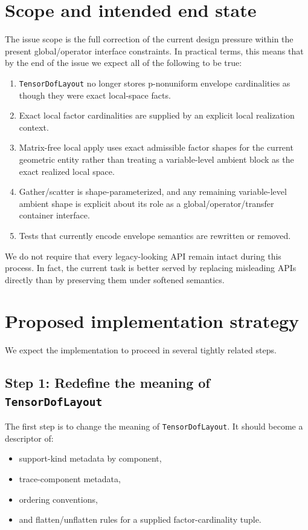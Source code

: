 \documentclass[11pt]{article}
\begin{document}
\section{Scope and intended end state}

The issue scope is the full correction of the current design pressure within the present global/operator interface constraints.  In practical terms, this means that by the end of the issue we expect all of the following to be true:

\begin{enumerate}[leftmargin=2em]
\item \texttt{TensorDofLayout} no longer stores p-nonuniform envelope cardinalities as though they were exact local-space facts.
\item Exact local factor cardinalities are supplied by an explicit local realization context.
\item Matrix-free local apply uses exact admissible factor shapes for the current geometric entity rather than treating a variable-level ambient block as the exact realized local space.
\item Gather/scatter is shape-parameterized, and any remaining variable-level ambient shape is explicit about its role as a global/operator/transfer container interface.
\item Tests that currently encode envelope semantics are rewritten or removed.
\end{enumerate}

We do not require that every legacy-looking API remain intact during this process.  In fact, the current task is better served by replacing misleading APIs directly than by preserving them under softened semantics.

\section{Proposed implementation strategy}

We expect the implementation to proceed in several tightly related steps.

\subsection{Step 1: Redefine the meaning of \texttt{TensorDofLayout}}

The first step is to change the meaning of \texttt{TensorDofLayout}.  It should become a descriptor of:

\begin{itemize}[leftmargin=2em]
\item support-kind metadata by component,
\item trace-component metadata,
\item ordering conventions,
\item and flatten/unflatten rules for a supplied factor-cardinality tuple.
\end{itemize}
\end{document}
